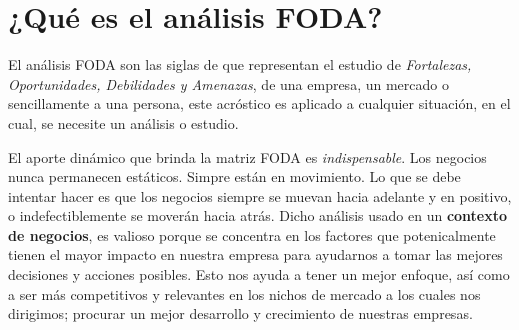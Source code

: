 \chapter{¿Qué es el análisis FODA?}
El análisis FODA son las siglas de que representan el estudio de \emph{Fortalezas, Oportunidades,
Debilidades y Amenazas}, de una empresa, un mercado o sencillamente a una persona, este acróstico
es aplicado a cualquier situación, en el cual, se necesite un análisis o estudio.

El aporte dinámico que brinda la matriz FODA es \emph{indispensable}. Los negocios nunca
permanecen estáticos. Simpre están en movimiento. Lo que se debe intentar hacer es que
los negocios siempre se muevan hacia adelante y en positivo, o indefectiblemente se moverán
hacia atrás.
Dicho análisis usado en un \textbf{contexto de negocios}, es valioso porque se concentra en
los factores que potenicalmente tienen el mayor impacto en nuestra empresa para ayudarnos
a tomar las mejores decisiones y acciones posibles. Esto nos ayuda a tener un mejor enfoque,
así como a ser más competitivos y relevantes en los nichos de mercado a los cuales nos
dirigimos; procurar un mejor desarrollo y crecimiento de nuestras empresas.